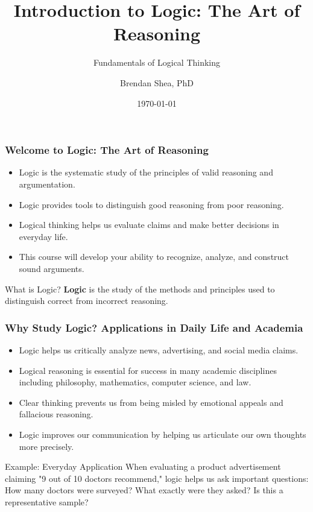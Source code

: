 \documentclass{beamer}
\title{Introduction to Logic: The Art of Reasoning}
\subtitle{Fundamentals of Logical Thinking}
\author{Brendan Shea, PhD}
\date{\today}
\begin{document}
\begin{frame}
    \titlepage
\end{frame}

\begin{frame}
    \frametitle{Welcome to Logic: The Art of Reasoning}
    \begin{itemize}
        \item Logic is the systematic study of the principles of valid reasoning and argumentation.
        \item Logic provides tools to distinguish good reasoning from poor reasoning.
        \item Logical thinking helps us evaluate claims and make better decisions in everyday life.
        \item This course will develop your ability to recognize, analyze, and construct sound arguments.
    \end{itemize}
    
    \begin{alertblock}{What is Logic?}
        \textbf{Logic} is the study of the methods and principles used to distinguish correct from incorrect reasoning.
    \end{alertblock}
\end{frame}

\begin{frame}
    \frametitle{Why Study Logic? Applications in Daily Life and Academia}
    \begin{itemize}
        \item Logic helps us critically analyze news, advertising, and social media claims.
        \item Logical reasoning is essential for success in many academic disciplines including philosophy, mathematics, computer science, and law.
        \item Clear thinking prevents us from being misled by emotional appeals and fallacious reasoning.
        \item Logic improves our communication by helping us articulate our own thoughts more precisely.
    \end{itemize}
    
    \begin{exampleblock}{Example: Everyday Application}
        When evaluating a product advertisement claiming "9 out of 10 doctors recommend," logic helps us ask important questions: How many doctors were surveyed? What exactly were they asked? Is this a representative sample?
    \end{exampleblock}
\end{frame}
\end{document}

